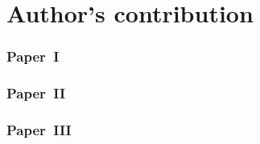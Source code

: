 
\chapter{\label{ch:author_contribution}Author's contribution}

\lipsum[21]

\begin{zeroindent}

  \subsection*{Paper~I}
  \lipsum[22]  
  
  \subsection*{Paper~II}
  \lipsum[23]
  
  \subsection*{Paper~III}
  \lipsum[24]
  
\end{zeroindent}
